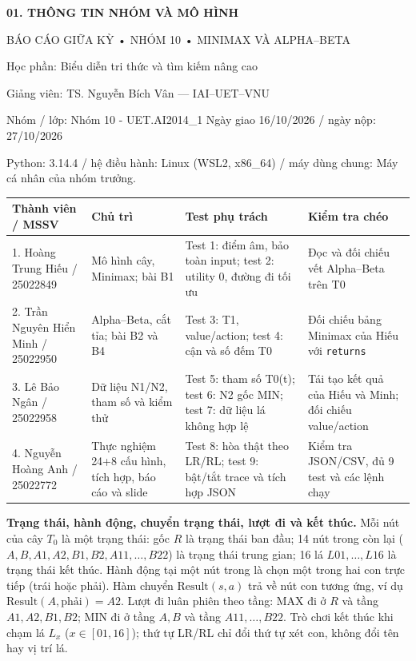 \documentclass[11pt,a4paper]{article}
\newcommand{\head}[1]{\par\Needspace{3\baselineskip}\medskip{\large\sffamily\bfseries\color{Ink}#1}\par}
\begin{document}
\small
{\Large\sffamily\bfseries\color{Ink}01. THÔNG TIN NHÓM VÀ MÔ HÌNH}\par\medskip
BÁO CÁO GIỮA KỲ • NHÓM 10 • MINIMAX VÀ ALPHA–BETA\par\medskip
Học phần: Biểu diễn tri thức và tìm kiếm nâng cao\par Giảng viên: TS. Nguyễn Bích Vân — IAI–UET–VNU\par\medskip
Nhóm / lớp: Nhóm 10 - UET.AI2014\_1 Ngày giao 16/10/2026 / ngày nộp: 27/10/2026\par Python: 3.14.4 / hệ điều hành: Linux (WSL2, x86\_64) / máy dùng chung: Máy cá nhân của nhóm trưởng.\par\medskip
\begingroup\footnotesize\renewcommand{\arraystretch}{1.45}\begin{tabularx}{\linewidth}{XXXX}\toprule
\textbf{Thành viên / MSSV} & \textbf{Chủ trì} & \textbf{Test phụ trách} & \textbf{Kiểm tra chéo}\\\midrule
1. Hoàng Trung Hiếu / 25022849 & Mô hình cây, Minimax; bài B1 & Test 1: điểm âm, bảo toàn input; test 2: utility 0, đường đi tối ưu & Đọc và đối chiếu vết Alpha--Beta trên T0\\
2. Trần Nguyên Hiển Minh / 25022950 & Alpha--Beta, cắt tỉa; bài B2 và B4 & Test 3: T1, value/action; test 4: cận và số đếm T0 & Đối chiếu bảng Minimax của Hiếu với \texttt{returns}\\
3. Lê Bảo Ngân / 25022958 & Dữ liệu N1/N2, tham số và kiểm thử & Test 5: tham số T0(t); test 6: N2 gốc MIN; test 7: dữ liệu lá không hợp lệ & Tái tạo kết quả của Hiếu và Minh; đối chiếu value/action\\
4. Nguyễn Hoàng Anh / 25022772 & Thực nghiệm 24+8 cấu hình, tích hợp, báo cáo và slide & Test 8: hòa thật theo LR/RL; test 9: bật/tắt trace và tích hợp JSON & Kiểm tra JSON/CSV, đủ 9 test và các lệnh chạy\\
\bottomrule\end{tabularx}\endgroup\par\medskip
\head{1. Bài toán nhóm đang giải}
\textbf{Trạng thái, hành động, chuyển trạng thái, lượt đi và kết thúc.}
Mỗi nút của cây $T_0$ là một trạng thái: gốc $R$ là trạng thái ban đầu; 14 nút trong còn lại ($A, B, A1, A2, B1, B2, A11, \dots, B22$) là trạng thái trung gian; 16 lá $L01, \dots, L16$ là trạng thái kết thúc.
Hành động tại một nút trong là chọn một trong hai con trực tiếp (trái hoặc phải).
Hàm chuyển $\mathrm{Result}(s,a)$ trả về nút con tương ứng, ví dụ $\mathrm{Result}(A, \text{phải}) = A2$.
Lượt đi luân phiên theo tầng: MAX đi ở $R$ và tầng $A1, A2, B1, B2$; MIN đi ở tầng $A, B$ và tầng $A11, \dots, B22$.
Trò chơi kết thúc khi chạm lá $L_x$ ($x \in [01, 16]$); thứ tự LR/RL chỉ đổi thứ tự xét con, không đổi tên hay vị trí lá.\par\medskip
\end{document}
